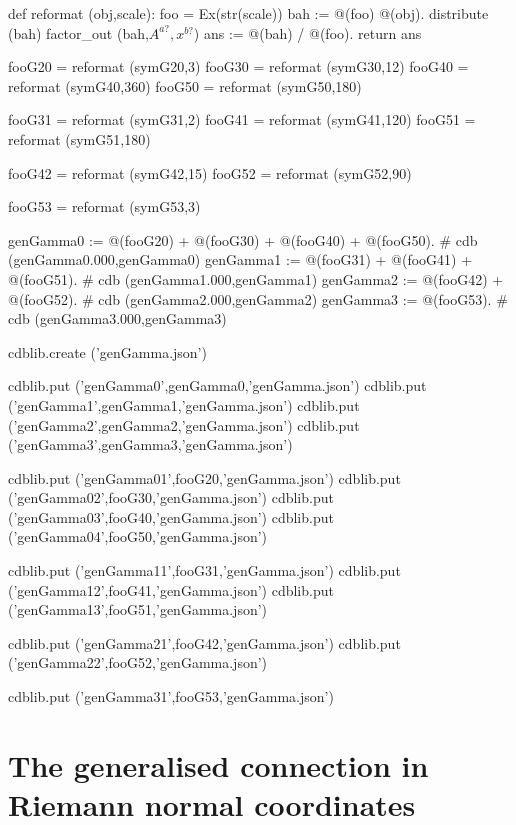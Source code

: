 \documentclass[12pt]{cdblatex}
\begin{document}
\begin{cadabra}
   def reformat (obj,scale):
       foo  = Ex(str(scale))
       bah := @(foo) @(obj).
       distribute (bah)
       factor_out (bah,$A^{a?},x^{b?}$)
       ans := @(bah) / @(foo).
       return ans

   fooG20 = reformat (symG20,3)
   fooG30 = reformat (symG30,12)
   fooG40 = reformat (symG40,360)
   fooG50 = reformat (symG50,180)

   fooG31 = reformat (symG31,2)
   fooG41 = reformat (symG41,120)
   fooG51 = reformat (symG51,180)

   fooG42 = reformat (symG42,15)
   fooG52 = reformat (symG52,90)

   fooG53 = reformat (symG53,3)

   genGamma0 := @(fooG20) + @(fooG30) + @(fooG40) + @(fooG50).  # cdb (genGamma0.000,genGamma0)
   genGamma1 := @(fooG31) + @(fooG41) + @(fooG51).              # cdb (genGamma1.000,genGamma1)
   genGamma2 := @(fooG42) + @(fooG52).                          # cdb (genGamma2.000,genGamma2)
   genGamma3 := @(fooG53).                                      # cdb (genGamma3.000,genGamma3)

   cdblib.create ('genGamma.json')

   cdblib.put ('genGamma0',genGamma0,'genGamma.json')
   cdblib.put ('genGamma1',genGamma1,'genGamma.json')
   cdblib.put ('genGamma2',genGamma2,'genGamma.json')
   cdblib.put ('genGamma3',genGamma3,'genGamma.json')

   cdblib.put ('genGamma01',fooG20,'genGamma.json')
   cdblib.put ('genGamma02',fooG30,'genGamma.json')
   cdblib.put ('genGamma03',fooG40,'genGamma.json')
   cdblib.put ('genGamma04',fooG50,'genGamma.json')

   cdblib.put ('genGamma11',fooG31,'genGamma.json')
   cdblib.put ('genGamma12',fooG41,'genGamma.json')
   cdblib.put ('genGamma13',fooG51,'genGamma.json')

   cdblib.put ('genGamma21',fooG42,'genGamma.json')
   cdblib.put ('genGamma22',fooG52,'genGamma.json')

   cdblib.put ('genGamma31',fooG53,'genGamma.json')

\end{cadabra}

\clearpage

\section*{The generalised connection in Riemann normal coordinates}
\end{document}
